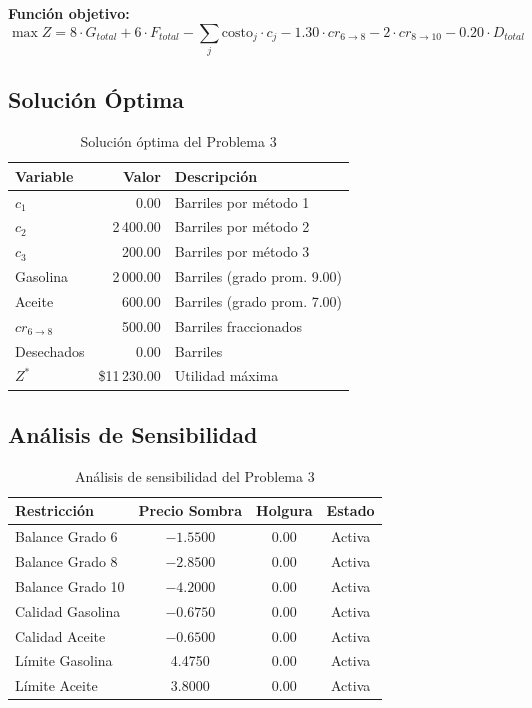 \documentclass[12pt,a4paper]{article}
\begin{document}
\textbf{Función objetivo:}
\[
\max Z = 8 \cdot G_{total} + 6 \cdot F_{total} - \sum_{j} \text{costo}_j \cdot c_j - 1.30 \cdot cr_{6\to8} - 2 \cdot cr_{8\to10} - 0.20 \cdot D_{total}
\]

\subsection{Solución Óptima}

\begin{table}[h]
\centering
\begin{tabular}{lrl}
\toprule
\textbf{Variable} & \textbf{Valor} & \textbf{Descripción} \\
\midrule
$c_1$ & 0.00 & Barriles por método 1 \\
$c_2$ & 2\,400.00 & Barriles por método 2 \\
$c_3$ & 200.00 & Barriles por método 3 \\
Gasolina & 2\,000.00 & Barriles (grado prom. 9.00) \\
Aceite & 600.00 & Barriles (grado prom. 7.00) \\
$cr_{6\to8}$ & 500.00 & Barriles fraccionados \\
Desechados & 0.00 & Barriles \\
$Z^*$ & \$11\,230.00 & Utilidad máxima \\
\bottomrule
\end{tabular}
\caption{Solución óptima del Problema 3}
\end{table}

\subsection{Análisis de Sensibilidad}

\begin{table}[h]
\centering
\begin{tabular}{lccc}
\toprule
\textbf{Restricción} & \textbf{Precio Sombra} & \textbf{Holgura} & \textbf{Estado} \\
\midrule
Balance Grado 6 & $-1.5500$ & 0.00 & Activa \\
Balance Grado 8 & $-2.8500$ & 0.00 & Activa \\
Balance Grado 10 & $-4.2000$ & 0.00 & Activa \\
Calidad Gasolina & $-0.6750$ & 0.00 & Activa \\
Calidad Aceite & $-0.6500$ & 0.00 & Activa \\
Límite Gasolina & 4.4750 & 0.00 & Activa \\
Límite Aceite & 3.8000 & 0.00 & Activa \\
\bottomrule
\end{tabular}
\caption{Análisis de sensibilidad del Problema 3}
\end{table}
\end{document}
